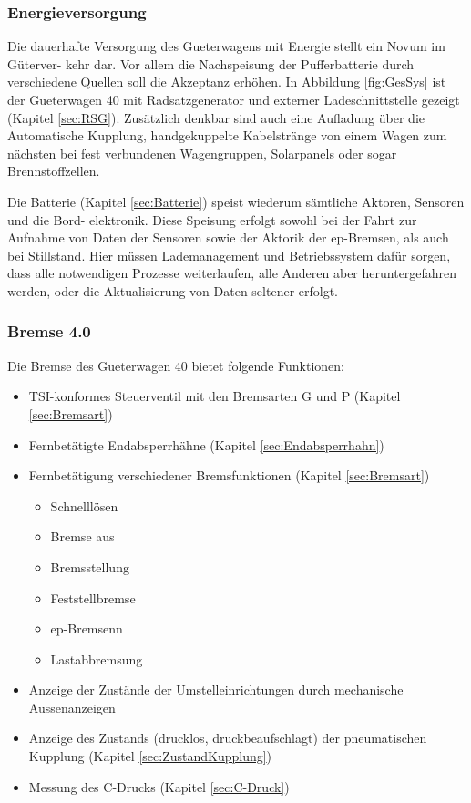 \subsubsection{Energieversorgung}
Die dauerhafte Versorgung des \gls{Gueterwagen}s mit Energie stellt ein Novum im Güterver- kehr dar. Vor allem die Nachspeisung der Pufferbatterie durch verschiedene Quellen soll die Akzeptanz erhöhen. In Abbildung \ref{fig:GesSys} ist der \gls{Gueterwagen 40} mit Radsatzgenerator und externer Ladeschnittstelle gezeigt (Kapitel \ref{sec:RSG}). Zusätzlich denkbar sind auch eine Aufladung über die Automatische Kupplung, handgekuppelte Kabelstränge von einem Wagen zum nächsten bei fest verbundenen Wagengruppen, Solarpanels oder sogar Brennstoffzellen. %
\par
Die Batterie (Kapitel \ref{sec:Batterie}) speist wiederum sämtliche Aktoren, Sensoren und die Bord- elektronik. Diese Speisung erfolgt sowohl bei der Fahrt zur Aufnahme von Daten der Sensoren sowie der Aktorik der \gls{ep-Bremsen}, als auch bei Stillstand. Hier müssen Lademanagement und Betriebssystem %
dafür sorgen, dass alle notwendigen Prozesse weiterlaufen, alle Anderen aber heruntergefahren werden, oder die Aktualisierung von Daten seltener erfolgt.


\subsubsection{Bremse 4.0}
Die Bremse des \gls{Gueterwagen 40} bietet folgende Funktionen:
\begin{itemize}
    \item \acrshort{TSI}-konformes Steuerventil mit den \gls{Bremsart}en G und P (Kapitel \ref{sec:Bremsart})
    \item Fernbetätigte Endabsperrhähne (Kapitel \ref{sec:Endabsperrhahn})
    \item Fernbetätigung verschiedener Bremsfunktionen  (Kapitel \ref{sec:Bremsart})
    \begin{itemize}
        \item Schnelllösen
        \item Bremse aus
        \item Bremsstellung
        \item Feststellbremse
        \item \gls{ep-Bremsen}n
        \item Lastabbremsung
    \end{itemize}
    \item Anzeige der Zustände der Umstelleinrichtungen durch mechanische Aussenanzeigen
    \item Anzeige des Zustands (drucklos, druckbeaufschlagt) der pneumatischen Kupplung (Kapitel \ref{sec:ZustandKupplung})
    \item Messung des C-Drucks (Kapitel \ref{sec:C-Druck})
\end{itemize}


